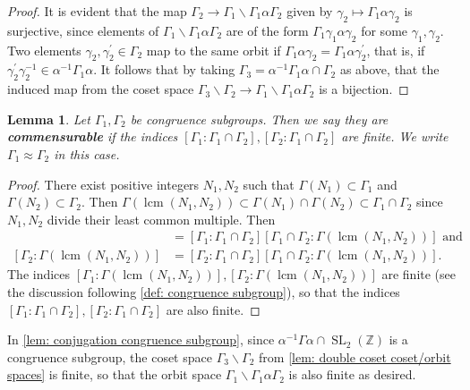 \documentclass[10pt,leqno,twoside]{article}
\theoremstyle{plain}
\newtheorem{lemma}[lem]{Lemma}
\theoremstyle{definition}
\numberwithin{equation}{section}
\numberwithin{lem}{section}
\newcommand{\textib}[1]{\textbf{\textit{#1\index{#1}}}} %
\DeclareMathOperator{\SL}{SL}
\newcommand{\slz}{\SL_2(\mathbb{Z})}
\DeclareMathOperator{\lcm}{lcm}
\begin{document}
\begin{proof}
    It is evident that the map $\varGamma_2\to \varGamma_1\backslash\varGamma_1\alpha\varGamma_2$ given by $\gamma_2\mapsto \varGamma_1\alpha\gamma_2$ is surjective, since elements of $\varGamma_1\backslash\varGamma_1\alpha\varGamma_2$ are of the form $\varGamma_1\gamma_1\alpha\gamma_2$ for some $\gamma_1,\gamma_2$. Two elements $\gamma_2,\gamma_2^\prime\in\varGamma_2$ map to the same orbit if $\varGamma_1\alpha\gamma_2 = \varGamma_1\alpha\gamma_2^\prime$, that is, if $\gamma_2^\prime\gamma_2^{-1}\in \alpha^{-1}\varGamma_1\alpha$. It follows that by taking $\varGamma_3 = \alpha^{-1}\varGamma_1\alpha\cap \varGamma_2$ as above, that the induced map from the coset space $\varGamma_3\backslash\varGamma_2\to \varGamma_1\backslash \varGamma_1\alpha\varGamma_2$ is a bijection.
\end{proof}
\begin{lemma}\label{lem: congruence subgroups commensurable}
    Let $\varGamma_1,\varGamma_2$ be congruence subgroups. Then we say they are \textib{commensurable} if the indices $[\varGamma_1 : \varGamma_1\cap \varGamma_2], [\varGamma_2 : \varGamma_1\cap \varGamma_2]$ are finite. We write $\varGamma_1\approx\varGamma_2$ in this case.
\end{lemma}
\begin{proof}
    There exist positive integers $N_1,N_2$ such that $\varGamma(N_1)\subset \varGamma_1$ and $\varGamma(N_2)\subset \varGamma_2$. Then $\varGamma(\lcm(N_1,N_2))\subset \varGamma(N_1)\cap \varGamma(N_2)\subset \varGamma_1\cap \varGamma_2$ since $N_1,N_2$ divide their least common multiple. Then \begin{align*}
        [\varGamma_1 : \varGamma(\lcm(N_1,N_2))] &= [\varGamma_1 : \varGamma_1\cap \varGamma_2][\varGamma_1\cap \varGamma_2 : \varGamma(\lcm(N_1,N_2))] \text{ and}\\
        [\varGamma_2 : \varGamma(\lcm(N_1,N_2))] &= [\varGamma_2 : \varGamma_1\cap \varGamma_2][\varGamma_1\cap \varGamma_2 : \varGamma(\lcm(N_1,N_2))].
    \end{align*} The indices $[\varGamma_1 : \varGamma(\lcm(N_1,N_2))],[\varGamma_2 : \varGamma(\lcm(N_1,N_2))]$ are finite (see the discussion following \cref{def: congruence subgroup}), so that the indices $[\varGamma_1 : \varGamma_1\cap \varGamma_2], [\varGamma_2 : \varGamma_1\cap \varGamma_2]$ are also finite.
\end{proof}
In \cref{lem: conjugation congruence subgroup}, since $\alpha^{-1}\varGamma\alpha\cap\slz$ is a congruence subgroup, the coset space $\varGamma_3\backslash \varGamma_2$ from \cref{lem: double coset coset/orbit spaces} is finite, so that the orbit space $\varGamma_1\backslash \varGamma_1\alpha\varGamma_2$ is also finite as desired.
\end{document}
